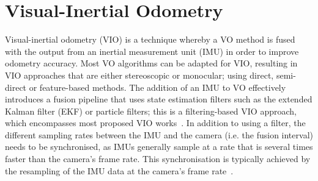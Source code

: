 \section{Visual-Inertial Odometry}
Visual-inertial odometry (VIO) is a technique whereby a VO method is fused with the output from an inertial measurement unit (IMU) in order to improve odometry accuracy. Most VO algorithms can be adapted for VIO, resulting in VIO approaches that are either stereoscopic or monocular; using direct, semi-direct or feature-based methods. The addition of an IMU to VO effectively introduces a fusion pipeline that uses state estimation filters such as the extended Kalman filter (EKF) or particle filters; this is a filtering-based VIO approach, which encompasses most proposed VIO works~\cite{gui_review_2015}. In addition to using a filter, the different sampling rates between the IMU and the camera (i.e. the fusion interval) needs to be synchronised, as IMUs generally sample at a rate that is several times faster than the camera's frame rate. This synchronisation is typically achieved by the resampling of the IMU data at the camera's frame rate~\cite{konolige_large-scale_2010}. 


